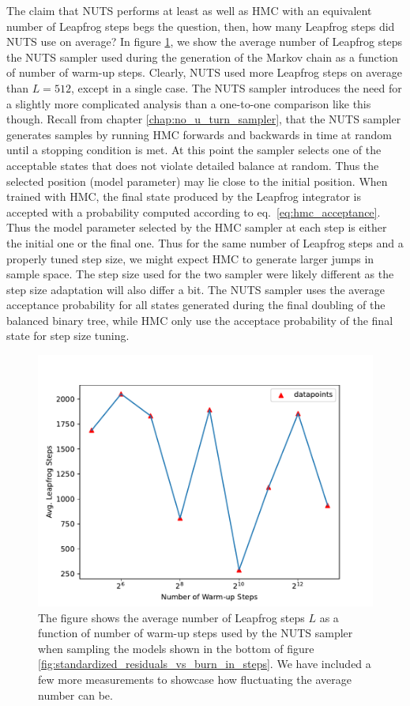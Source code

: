 The claim that NUTS performs at least as well as HMC with an equivalent number of Leapfrog steps begs the question, then, how many Leapfrog steps did NUTS use on average? In figure \ref{fig:avg_leapfrog_steps_vs_burn_in}, we show the average number of Leapfrog steps the NUTS sampler used during the generation of the Markov chain as a function of number of warm-up steps. Clearly, NUTS used more Leapfrog steps on average than $L = 512$, except in a single case. The NUTS sampler introduces the need for a slightly more complicated analysis than a one-to-one comparison like this though. Recall from chapter \ref{chap:no_u_turn_sampler}, that the NUTS sampler generates samples by running HMC forwards and backwards in time at random until a stopping condition is met. At this point the sampler selects one of the acceptable states that does not violate detailed balance at random. Thus the selected position (model parameter) may lie close to the initial position.
When trained with HMC, the final state produced by the Leapfrog integrator is accepted with a probability computed according to eq.~\eqref{eq:hmc_acceptance}. Thus the model parameter selected by the HMC sampler at each step is either the initial one or the final one. Thus for the same number of Leapfrog steps and a properly tuned step size, we might expect HMC to generate larger jumps in sample space. The step size used for the two sampler were likely different as the step size adaptation will also differ a bit. The NUTS sampler uses the average acceptance probability for all states generated during the final doubling of the balanced binary tree, while HMC only use the acceptace probability of the final state for step size tuning.

\begin{figure}[H]
    \centering
    \includegraphics[scale=0.7]{figures/standardized_residuals/effect_of_burnin/avg_burnin_steps_nuts_vs_burn_in_steps.pdf}
    \caption{The figure shows the average number of Leapfrog steps $L$ as a function of number of warm-up steps used by the NUTS sampler when sampling the models shown in the bottom of figure \ref{fig:standardized_residuals_vs_burn_in_steps}. We have included a few more measurements to showcase how fluctuating the average number can be. 
    }
    \label{fig:avg_leapfrog_steps_vs_burn_in}
\end{figure}


